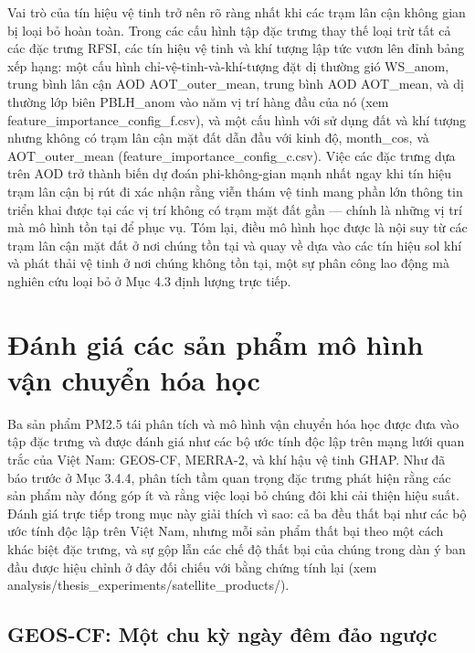 Vai trò của tín hiệu vệ tinh trở nên rõ ràng nhất khi các trạm lân cận không gian bị loại bỏ hoàn toàn. Trong các cấu hình tập đặc trưng thay thế loại trừ tất cả các đặc trưng RFSI, các tín hiệu vệ tinh và khí tượng lập tức vươn lên đỉnh bảng xếp hạng: một cấu hình chỉ-vệ-tinh-và-khí-tượng đặt dị thường gió WS\_anom, trung bình lân cận AOD AOT\_outer\_mean, trung bình AOD AOT\_mean, và dị thường lớp biên PBLH\_anom vào năm vị trí hàng đầu của nó (xem feature\_importance\_config\_f.csv), và một cấu hình với sử dụng đất và khí tượng nhưng không có trạm lân cận mặt đất dẫn đầu với kinh độ, month\_cos, và AOT\_outer\_mean (feature\_importance\_config\_c.csv). Việc các đặc trưng dựa trên AOD trở thành biến dự đoán phi-không-gian mạnh nhất ngay khi tín hiệu trạm lân cận bị rút đi xác nhận rằng viễn thám vệ tinh mang phần lớn thông tin triển khai được tại các vị trí không có trạm mặt đất gần --- chính là những vị trí mà mô hình tồn tại để phục vụ. Tóm lại, điều mô hình học được là nội suy từ các trạm lân cận mặt đất ở nơi chúng tồn tại và quay về dựa vào các tín hiệu sol khí và phát thải vệ tinh ở nơi chúng không tồn tại, một sự phân công lao động mà nghiên cứu loại bỏ ở Mục 4.3 định lượng trực tiếp.


\section{Đánh giá các sản phẩm mô hình vận chuyển hóa học}

Ba sản phẩm PM2.5 tái phân tích và mô hình vận chuyển hóa học được đưa vào tập đặc trưng và được đánh giá như các bộ ước tính độc lập trên mạng lưới quan trắc của Việt Nam: GEOS-CF, MERRA-2, và khí hậu vệ tinh GHAP. Như đã báo trước ở Mục 3.4.4, phân tích tầm quan trọng đặc trưng phát hiện rằng các sản phẩm này đóng góp ít và rằng việc loại bỏ chúng đôi khi cải thiện hiệu suất. Đánh giá trực tiếp trong mục này giải thích vì sao: cả ba đều thất bại như các bộ ước tính độc lập trên Việt Nam, nhưng mỗi sản phẩm thất bại theo một cách khác biệt đặc trưng, và sự gộp lẫn các chế độ thất bại của chúng trong dàn ý ban đầu được hiệu chỉnh ở đây đối chiếu với bằng chứng tính lại (xem analysis/thesis\_experiments/satellite\_products/).

\subsection{GEOS-CF: Một chu kỳ ngày đêm đảo ngược}

